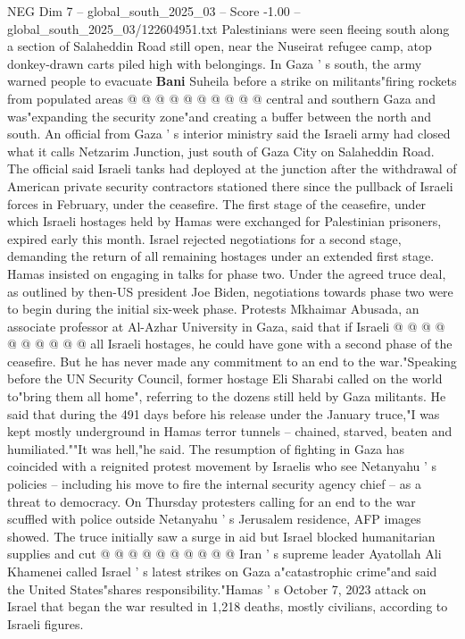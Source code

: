 \begin{textsample}{NEG Dim 7 – global\_south\_2025\_03 – Score -1.00 – global\_south\_2025\_03/122604951.txt}
Palestinians were seen fleeing south along a section of Salaheddin Road still open, near the Nuseirat refugee camp, atop donkey-drawn carts piled high with belongings.
In Gaza ' s south, the army warned people to evacuate \textbf{Bani} Suheila before a strike on militants"firing rockets from populated areas @ @ @ @ @ @ @ @ @ @ central and southern Gaza and was"expanding the security zone"and creating a buffer between the north and south.
An official from Gaza ' s interior ministry said the Israeli army had closed what it calls Netzarim Junction, just south of Gaza City on Salaheddin Road.
The official said Israeli tanks had deployed at the junction after the withdrawal of American private security contractors stationed there since the pullback of Israeli forces in February, under the ceasefire.
The first stage of the ceasefire, under which Israeli hostages held by Hamas were exchanged for Palestinian prisoners, expired early this month.
Israel rejected negotiations for a second stage, demanding the return of all remaining hostages under an extended first stage.
Hamas insisted on engaging in talks for phase two.
Under the agreed truce deal, as outlined by then-US president Joe Biden, negotiations towards phase two were to begin during the initial six-week phase.
Protests Mkhaimar Abusada, an associate professor at Al-Azhar University in Gaza, said that if Israeli @ @ @ @ @ @ @ @ @ @ all Israeli hostages, he could have gone with a second phase of the ceasefire.
But he has never made any commitment to an end to the war."Speaking before the UN Security Council, former hostage Eli Sharabi called on the world to"bring them all home", referring to the dozens still held by Gaza militants.
He said that during the 491 days before his release under the January truce,"I was kept mostly underground in Hamas terror tunnels -- chained, starved, beaten and humiliated.""It was hell,"he said.
The resumption of fighting in Gaza has coincided with a reignited protest movement by Israelis who see Netanyahu ' s policies -- including his move to fire the internal security agency chief -- as a threat to democracy.
On Thursday protesters calling for an end to the war scuffled with police outside Netanyahu ' s Jerusalem residence, AFP images showed.
The truce initially saw a surge in aid but Israel blocked humanitarian supplies and cut @ @ @ @ @ @ @ @ @ @ Iran ' s supreme leader Ayatollah Ali Khamenei called Israel ' s latest strikes on Gaza a"catastrophic crime"and said the United States"shares responsibility."Hamas ' s October 7, 2023 attack on Israel that began the war resulted in 1,218 deaths, mostly civilians, according to Israeli figures.

\end{textsample}
